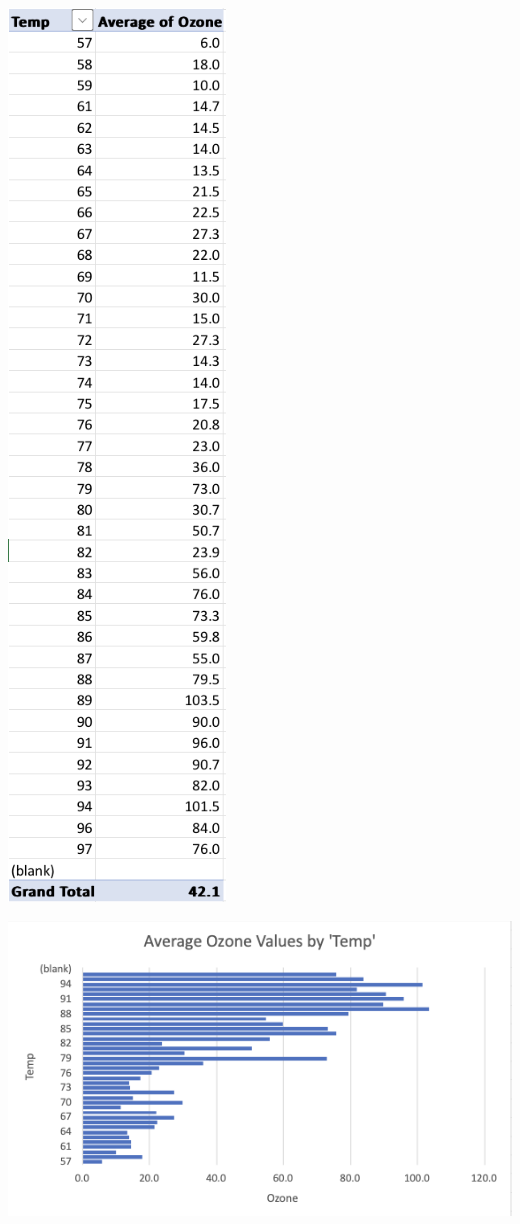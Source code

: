 \documentclass[
  letterpaper,
  DIV=11,
  numbers=noendperiod]{scrreprt}
\begin{document}
\includegraphics{PivotTable2_AverageOzoneByTemp_Pena.png}

\includegraphics{PivotChart2_AverageOzoneByTemp_Pena.png}
\end{document}
